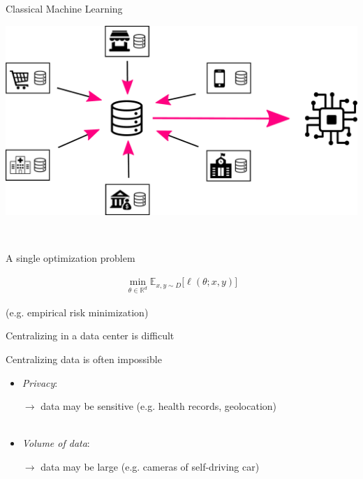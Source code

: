 \documentclass[aspectratio=169,12pt]{beamer}
\begin{document}
\begin{frame}{Classical Machine Learning}
  
  \begin{minipage}{0.4\linewidth}
    \begin{center}
      \includegraphics[width=\linewidth]{images/centralize-data.pdf}
    \end{center}
    
  \end{minipage}~~~~%
  \begin{minipage}{0.5\linewidth}
    \pause
    \begin{center}
      A single optimization problem      
    \end{center}
    \begin{align*}
      \min_{\theta \in \mathbb{R}^d} \mathbb{E}_{x, y \sim D} \Big[ \ell( \theta; x, y ) \Big]
    \end{align*}

    \begin{center}
      (e.g. empirical risk minimization)
    \end{center}
    
  \end{minipage}
\end{frame}

\begin{frame}[t]{Centralizing in a data center is difficult}

  Centralizing data is often impossible
  \begin{itemize}
  \item \emph{Privacy}:

    {\small
    $\rightarrow$ data may be sensitive (e.g. health records, geolocation)
    }
    \\
    ~

  \item \emph{Volume of data}:

    {\small
      $\rightarrow$ data may be large (e.g. cameras of self-driving car)
    }
    \\
    ~
    

    
  \end{itemize}

\end{frame}
\end{document}
